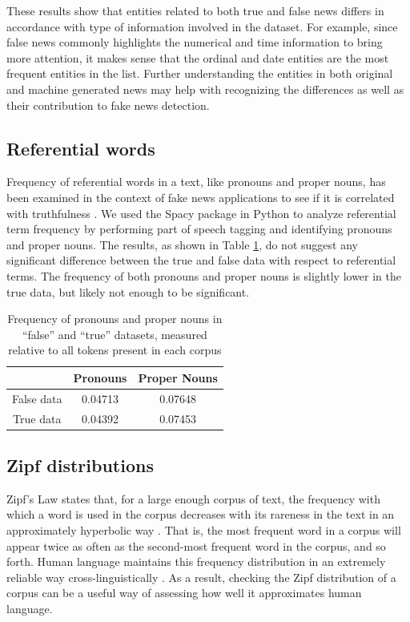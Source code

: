\documentclass[11pt,a4paper]{article}
\begin{document}
 These results show that entities related to both true and false news differs in accordance with type of information involved in the dataset. For example, since false news commonly highlights the numerical and time information to bring more attention, it makes sense that the ordinal and date entities are the most frequent entities in the list. Further understanding the entities in both original and machine generated news may help with recognizing the differences as well as their contribution to fake news detection.
 
\subsection{Referential words}
Frequency of referential words in a text, like pronouns and proper nouns, has been examined in the context of fake news applications to see if it is correlated with truthfulness  \citep[e.g.][]{mahyoob2020linguistic}. We used the Spacy package in Python to analyze referential term frequency by performing part of speech tagging and identifying pronouns and proper nouns. The results, as shown in Table \ref{table:ref_words}, do not suggest any significant difference between the true and false data with respect to referential terms. The frequency of both pronouns and proper nouns is slightly lower in the true data, but likely not enough to be significant.

\begin{table}
\centering
\begin{tabular}{ c||c|c } 
  & Pronouns & Proper Nouns\\ 
 \hline
 False data & 0.04713 & 0.07648 \\ 
 True data & 0.04392 & 0.07453 \\ 
\end{tabular}
\caption{Frequency of pronouns and proper nouns in ``false'' and ``true'' datasets, measured relative to all tokens present in each corpus}
\label{table:ref_words}
\end{table}

\subsection{Zipf distributions}
Zipf's Law states that, for a large enough corpus of text, the frequency with which a word is used in the corpus decreases with its rareness in the text in an approximately hyperbolic way \citep{baayen2001word}. That is, the most frequent word in a corpus will appear twice as often as the second-most frequent word in the corpus, and so forth. Human language maintains this frequency distribution in an extremely reliable way cross-linguistically \citep{piantadosi2014zipf}. As a result, checking the Zipf distribution of a corpus can be a useful way of assessing how well it approximates human language. 
\end{document}
